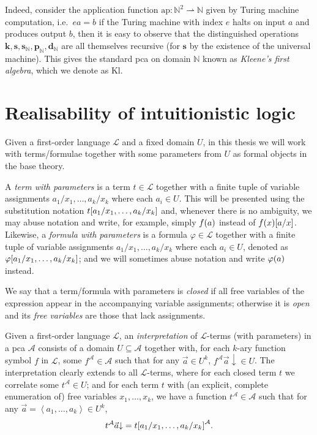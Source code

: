 \documentclass[12pt,openany]{book}
\makeatletter
\newcommand\indg[1]{\index{A@General!#1}}
\theoremstyle{plain}
\theoremstyle{definition}
\newcommand\tuple[1]{\left\langle #1 \right\rangle}
\newcommand\Kl{\mathrm{Kl}}
\newcommand\bk{\mathbf{k}}
\newcommand\bs{\mathbf{s}}
\newcommand\bsN{\mathbf{s}_\mathbb{N}}
\newcommand\bpN{\mathbf{p}_\mathbb{N}}
\newcommand\bdN{\mathbf{d}_\mathbb{N}}
\makeatother
\begin{document}
Indeed, consider the application function $\mathrm{ap} : \mathbb{N}^2 \rightharpoonup \mathbb{N}$ given by Turing machine computation, i.e.\ $ea = b$ if the Turing machine with index $e$ halts on input $a$ and produces output $b$, then it is easy to observe that the distinguished operations $\bk, \bs, \bsN, \bpN, \bdN$ are all themselves recursive (for $\bs$ by the existence of the universal machine). This gives the standard pca on domain $\mathbb{N}$ known as \emph{Kleene's first algebra}\indg{Kleene's first algebra, $\Kl$}, which we denote as $\Kl$.

\section{Realisability of intuitionistic logic}
\label{sec:real-con-int-logic}

Given a first-order language $\mathcal{L}$ and a fixed domain $U$, in this thesis we will work with terms/formulae together with some parameters from $U$ as formal objects in the base theory.

A \emph{term with parameters} is a term $t \in \mathcal{L}$ together with a finite tuple of variable assignments $a_1/x_1, \ldots, a_k/x_k$ where each $a_i \in U$. This will be presented using the substitution notation $t\mleft[a_1/x_1, \ldots, a_k/x_k\mright]$ and, whenever there is no ambiguity, we may abuse notation and write, for example, simply $f\mleft(a\mright)$ instead of $f\mleft(x\mright)\mleft[a/x\mright]$. Likewise, a \emph{formula with parameters} is a formula $\varphi \in \mathcal{L}$ together with a finite tuple of variable assignments $a_1/x_1, \ldots, a_k/x_k$ where each $a_i \in U$, denoted as $\varphi\mleft[a_1/x_1, \ldots, a_k/x_k\mright]$; and we will sometimes abuse notation and write $\varphi\mleft(a\mright)$ instead.

We say that a term/formula with parameters is \emph{closed} if all free variables of the expression appear in the accompanying variable assignments; otherwise it is \emph{open} and its \emph{free variables} are those that lack assignments.

Given a first-order language $\mathcal{L}$, an \emph{interpretation} of $\mathcal{L}$-terms (with parameters) in a pca $\mathcal{A}$ consists of a domain $U \subseteq \mathcal{A}$ together with, for each $k$-ary function symbol $f$ in $\mathcal{L}$, some $f^\mathcal{A} \in \mathcal{A}$ such that for any $\vec{a} \in U^k$, $f^\mathcal{A} \vec{a} {\downarrow} \in U$. The interpretation clearly extends to all $\mathcal{L}$-terms, where for each closed term $t$ we correlate some $t^\mathcal{A} \in U$; and for each term $t$ with (an explicit, complete enumeration of) free variables $x_1, \ldots, x_k$, we have a function $t^\mathcal{A} \in \mathcal{A}$ such that for any $\vec{a} = \tuple{a_1, \ldots, a_k} \in U^k$,
\[t^\mathcal{A} \vec{a} {\downarrow} = t\mleft[a_1/x_1, \ldots, a_k/x_k\mright]^\mathcal{A}.\]
\end{document}
